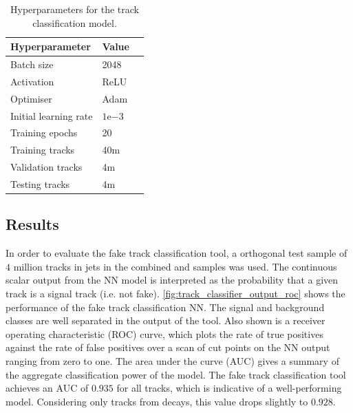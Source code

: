 \begin{table}[!htbp]
  \footnotesize\centering
  \setlength{\tabcolsep}{0.5em} %
  \begin{tabular}{lll}
      \toprule\hline
      \textbf{Hyperparameter} & \textbf{Value} \\
      \hline
      Batch size & 2048 \\
      Activation & ReLU \\
      Optimiser & Adam \\
      Initial learning rate & $1\text{e}{-3}$ \\
      Training epochs & 20 \\
      Training tracks & 40m \\
      Validation tracks & 4m \\
      Testing tracks & 4m \\
      \hline\bottomrule
  \end{tabular}
  \caption{
    Hyperparameters for the track classification model.
  }
  \label{tab:fake_track_mva_hyperparams}
\end{table}


\subsection{Results}\label{sec:fake_track_mva_results}


In order to evaluate the fake track classification tool, a orthogonal test sample of $4$ million tracks in jets in the combined \ttbar and \Zprime samples was used.
The continuous scalar output from the NN model is interpreted as the probability that a given track is a signal track (i.e. not fake).
\cref{fig:track_classifier_output_roc} shows the performance of the fake track classification NN. The signal and background classes are well separated in the output of the tool.
Also shown is a receiver operating characteristic (ROC) curve, which plots the rate of true positives against the rate of false positives over a scan of cut points on the NN output ranging from zero to one.
The area under the curve (AUC) gives a summary of the aggregate classification power of the model.
The fake track classification tool achieves an AUC of $0.935$ for all tracks, which is indicative of a well-performing model.
Considering only tracks from \bhadron decays, this value drops slightly to $0.928$. 

